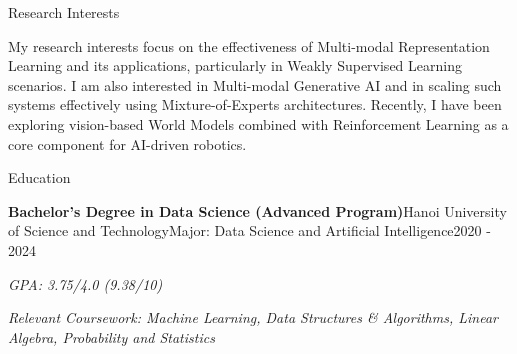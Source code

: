 \documentclass{resume} %
\newcommand{\italicitem}[1]{\item{\textit{#1}}}
\begin{document}



\begin{rSection}{Research Interests}

My research interests focus on the effectiveness of Multi-modal Representation Learning and its applications, particularly in Weakly Supervised Learning scenarios. I am also interested in Multi-modal Generative AI and in scaling such systems effectively using Mixture-of-Experts architectures. Recently, I have been exploring vision-based World Models combined with Reinforcement Learning as a core component for AI-driven robotics.
    
\end{rSection}

\begin{rSection}{Education}
    
    \begin{rSubsectionNoBullet}{\bf Bachelor's Degree in Data Science (Advanced Program)}{Hanoi University of Science and Technology}{Major: Data Science and Artificial Intelligence}{2020 - 2024}
        \italicitem{GPA: 3.75/4.0 (9.38/10)}
        \italicitem{Relevant Coursework: Machine Learning, Data Structures \& Algorithms, Linear Algebra, Probability and Statistics}
    \end{rSubsectionNoBullet}

\end{rSection}
\end{document}
